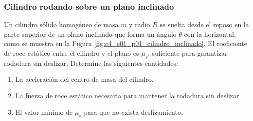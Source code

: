 \subsubsection{Cilindro rodando sobre un plano inclinado}

Un cilindro sólido homogéneo de masa $m$ y radio $R$ se suelta desde el reposo en la parte superior de un plano inclinado que forma un ángulo $\theta$ con la horizontal, como se muestra en la Figura \ref{fig:c4_e01_p01_cilindro_inclinado}. El coeficiente de roce estático entre el cilindro y el plano es $\mu_s$, suficiente para garantizar rodadura sin deslizar. Determine las siguientes cantidades:

\begin{enumerate}
    \item La aceleración del centro de masa del cilindro.
    \item La fuerza de roce estático necesaria para mantener la rodadura sin deslizar.
    \item El valor mínimo de $\mu_s$ para que no exista deslizamiento.
\end{enumerate}

